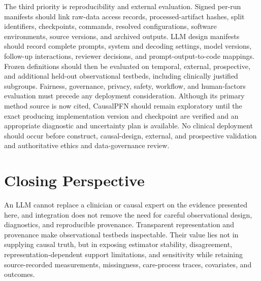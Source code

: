 The third priority is reproducibility and external evaluation.  Signed per-run manifests should link raw-data access records, processed-artifact hashes, split identifiers, checkpoints, commands, resolved configurations, software environments, source versions, and archived outputs.  LLM design manifests should record complete prompts, system and decoding settings, model versions, follow-up interactions, reviewer decisions, and prompt-output-to-code mappings.  Frozen definitions should then be evaluated on temporal, external, prospective, and additional held-out observational testbeds, including clinically justified subgroups.  Fairness, governance, privacy, safety, workflow, and human-factors evaluation must precede any deployment consideration.  Although its primary method source is now cited, CausalPFN should remain exploratory until the exact producing implementation version and checkpoint are verified and an appropriate diagnostic and uncertainty plan is available.  No clinical deployment should occur before construct, causal-design, external, and prospective validation and authoritative ethics and data-governance review.

\section{Closing Perspective}
\label{sec:conclusions-future-work:closing-perspective}

An LLM cannot replace a clinician or causal expert on the evidence presented here, and integration does not remove the need for careful observational design, diagnostics, and reproducible provenance.  Transparent representation and provenance make observational testbeds inspectable.  Their value lies not in supplying causal truth, but in exposing estimator stability, disagreement, representation-dependent support limitations, and sensitivity while retaining source-recorded measurements, missingness, care-process traces, covariates, and outcomes.
